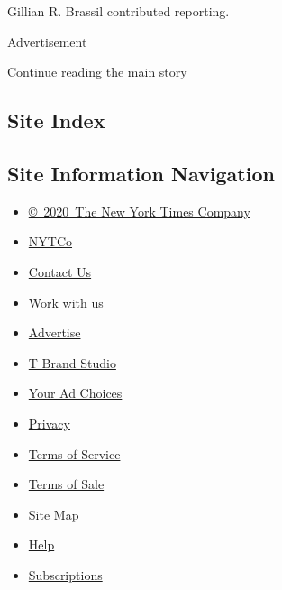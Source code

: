 Gillian R. Brassil contributed reporting.

Advertisement

\protect\hyperlink{after-bottom}{Continue reading the main story}

\hypertarget{site-index}{%
\subsection{Site Index}\label{site-index}}

\hypertarget{site-information-navigation}{%
\subsection{Site Information
Navigation}\label{site-information-navigation}}

\begin{itemize}
\tightlist
\item
  \href{https://help.nytimes3xbfgragh.onion/hc/en-us/articles/115014792127-Copyright-notice}{©~2020~The
  New York Times Company}
\end{itemize}

\begin{itemize}
\tightlist
\item
  \href{https://www.nytco.com/}{NYTCo}
\item
  \href{https://help.nytimes3xbfgragh.onion/hc/en-us/articles/115015385887-Contact-Us}{Contact
  Us}
\item
  \href{https://www.nytco.com/careers/}{Work with us}
\item
  \href{https://nytmediakit.com/}{Advertise}
\item
  \href{http://www.tbrandstudio.com/}{T Brand Studio}
\item
  \href{https://www.nytimes3xbfgragh.onion/privacy/cookie-policy\#how-do-i-manage-trackers}{Your
  Ad Choices}
\item
  \href{https://www.nytimes3xbfgragh.onion/privacy}{Privacy}
\item
  \href{https://help.nytimes3xbfgragh.onion/hc/en-us/articles/115014893428-Terms-of-service}{Terms
  of Service}
\item
  \href{https://help.nytimes3xbfgragh.onion/hc/en-us/articles/115014893968-Terms-of-sale}{Terms
  of Sale}
\item
  \href{https://spiderbites.nytimes3xbfgragh.onion}{Site Map}
\item
  \href{https://help.nytimes3xbfgragh.onion/hc/en-us}{Help}
\item
  \href{https://www.nytimes3xbfgragh.onion/subscription?campaignId=37WXW}{Subscriptions}
\end{itemize}
